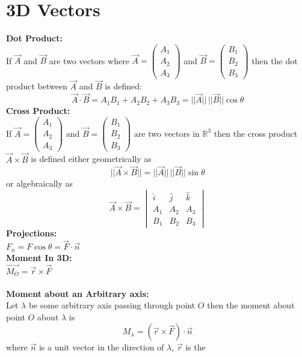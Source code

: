 \documentclass[14pt]{article}
\begin{document}
    \section{3D Vectors}
    \textbf{Dot Product:}\\
    If $\vec{A}$ and $\vec{B}$ are two vectors where
    $\vec{A}=\begin{pmatrix}A_1\\A_2\\A_3 \end{pmatrix}$ and
    $\vec{B}=\begin{pmatrix}B_1\\B_2\\B_3\end{pmatrix}$ then the dot
    product between $\vec{A}$ and $\vec{B}$ is defined:
    $$\vec{A}\cdot
    \vec{B}=A_1B_1+A_2B_2+A_3B_3=||\vec{A}||\,||\vec{B}||\cos\theta$$
    \textbf{Cross Product:}\\
    If $\vec{A}=\begin{pmatrix}A_1\\A_2\\A_3 \end{pmatrix}$ and
    $\vec{B}=\begin{pmatrix}B_1\\B_2\\B_3\end{pmatrix}$ are two vectors
    in $\mathbb{R}^3$ then the cross product $\vec{A}\times\vec{B}$ is
    defined either geometrically as
    $$||\vec{A}\times\vec{B}||=||\vec{A}||\,||\vec{B}||\sin\theta$$ or
    algebraically as $$\vec{A}\times\vec{B}=\begin{vmatrix} \hat{i} &
    \hat{j} &\hat{k}\\
        A_1 & A_2 & A_3\\
        B_1 & B_2 & B_3 \end{vmatrix}$$ \textbf{Projections:}\\
    $F_n=F\cos\theta=\vec{F}\cdot\vec{n}$\\
    \textbf{Moment In 3D: }\\
    $\vec{M_O}=\vec{r}\times\vec{F}$\\\\
    \textbf{Moment about an Arbitrary axis:}\\
    Let $\lambda$ be some arbitrary axis passing through point $O$ then
    the moment about point $O$ about $\lambda$ is 
    $$M_\lambda=(\vec{r}\times\vec{F})\cdot\vec{n}$$ where $\vec{n}$ is
    a unit vector in the direction of $\lambda$, $\vec{r}$ is the
\end{document}
